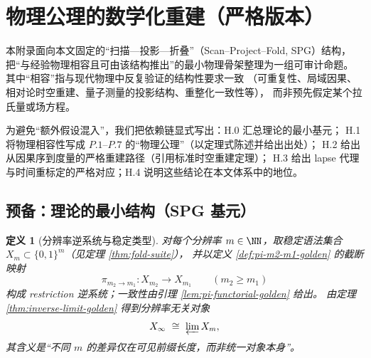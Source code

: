 \section{物理公理的数学化重建（严格版本）}
\label{app:physical-axioms-strict}

本附录面向本文固定的“扫描—投影—折叠”（Scan--Project--Fold, SPG）结构，
把“与经验物理相容且可由该结构推出”的最小物理骨架整理为一组可审计命题。
其中“相容”指与现代物理中反复验证的结构性要求一致
（可重复性、局域因果、相对论时空重建、量子测量的投影结构、重整化一致性等），
而非预先假定某个拉氏量或场方程。

为避免“额外假设混入”，我们把依赖链显式写出：H.0 汇总理论的最小基元；
H.1 将物理相容性写成 \(P.1\)--\(P.7\) 的“物理公理”（以定理式陈述并给出出处）；
H.2 给出从因果序到度量的严格重建路径（引用标准时空重建定理）；
H.3 给出 lapse 代理与时间重标定的严格对应；H.4 说明这些结论在本文体系中的地位。

\newtheorem{hdefinition}{定义}[subsection]
\newtheorem{hproposition}[hdefinition]{命题}
\newtheorem{hcorollary}[hdefinition]{推论}
\newtheorem{htheorem}[hdefinition]{定理}
\newtheorem{hremark}[hdefinition]{注}

\newtheorem{physicalaxiom}{物理公理}
\renewcommand{\thephysicalaxiom}{P.\arabic{physicalaxiom}}

\setcounter{subsection}{-1}
\subsection{预备：理论的最小结构（SPG 基元）}
\label{subsec:appH0-prelim}

\begin{hdefinition}[分辨率逆系统与稳定类型]\label{def:appH0-inverse-system}
对每个分辨率 \(m\in\NN\)，取稳定语法集合 \(X_m\subset\{0,1\}^m\)（见定理 \ref{thm:fold-suite}），
并以定义 \ref{def:pi-m2-m1-golden} 的截断映射
\[
\pi_{m_2\to m_1}:X_{m_2}\to X_{m_1}\qquad(m_2\ge m_1)
\]
构成 restriction 逆系统；一致性由引理 \ref{lem:pi-functorial-golden} 给出。
由定理 \ref{thm:inverse-limit-golden} 得到分辨率无关对象
\[
X_\infty\ \cong\ \varprojlim X_m,
\]
其含义是“不同 \(m\) 的差异仅在可见前缀长度，而非统一对象本身”。
\end{hdefinition}

